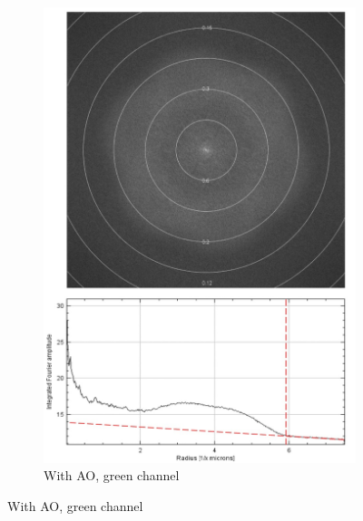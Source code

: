 \begin{figure}
\begin{subfigure}[t]{0.45\textwidth}
		\includegraphics[width=\linewidth]{images/DeepSIM_NMJ_AO_GFP_ft_and_plot.jpg}
		\caption{With AO, green channel}
		\label{fig:DeepSIM_NMJ_AO_GFP_ft_and_plot}
	\end{subfigure}
	

\end{figure}
